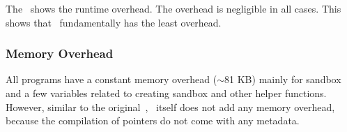 The~ shows the runtime overhead. The overhead is negligible in all cases.
This shows that~\systemname{} fundamentally has the least overhead.


\subsubsection{Memory Overhead}
All programs have a constant memory overhead ($\sim$81 KB) mainly for sandbox and a few variables related to creating sandbox and other helper functions.
However, similar to the original~\checkedc,~\systemname{} itself does not add any memory overhead,
because the compilation of  pointers do not come with any metadata.




